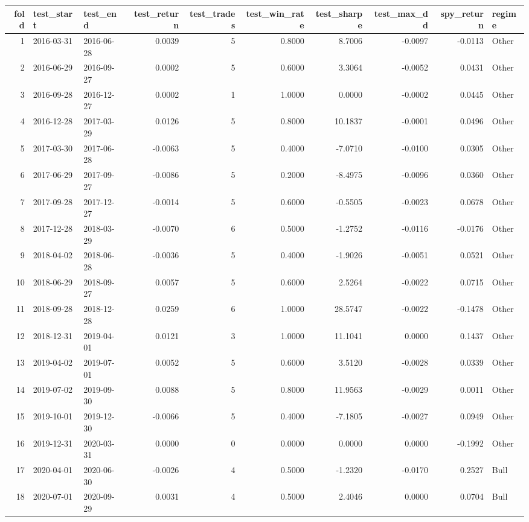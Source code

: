 \begin{tabular}{rllrrrrrrl}
\toprule
fold & test_start & test_end & test_return & test_trades & test_win_rate & test_sharpe & test_max_dd & spy_return & regime \\
\midrule
1 & 2016-03-31 & 2016-06-28 & 0.0039 & 5 & 0.8000 & 8.7006 & -0.0097 & -0.0113 & Other \\
2 & 2016-06-29 & 2016-09-27 & 0.0002 & 5 & 0.6000 & 3.3064 & -0.0052 & 0.0431 & Other \\
3 & 2016-09-28 & 2016-12-27 & 0.0002 & 1 & 1.0000 & 0.0000 & -0.0002 & 0.0445 & Other \\
4 & 2016-12-28 & 2017-03-29 & 0.0126 & 5 & 0.8000 & 10.1837 & -0.0001 & 0.0496 & Other \\
5 & 2017-03-30 & 2017-06-28 & -0.0063 & 5 & 0.4000 & -7.0710 & -0.0100 & 0.0305 & Other \\
6 & 2017-06-29 & 2017-09-27 & -0.0086 & 5 & 0.2000 & -8.4975 & -0.0096 & 0.0360 & Other \\
7 & 2017-09-28 & 2017-12-27 & -0.0014 & 5 & 0.6000 & -0.5505 & -0.0023 & 0.0678 & Other \\
8 & 2017-12-28 & 2018-03-29 & -0.0070 & 6 & 0.5000 & -1.2752 & -0.0116 & -0.0176 & Other \\
9 & 2018-04-02 & 2018-06-28 & -0.0036 & 5 & 0.4000 & -1.9026 & -0.0051 & 0.0521 & Other \\
10 & 2018-06-29 & 2018-09-27 & 0.0057 & 5 & 0.6000 & 2.5264 & -0.0022 & 0.0715 & Other \\
11 & 2018-09-28 & 2018-12-28 & 0.0259 & 6 & 1.0000 & 28.5747 & -0.0022 & -0.1478 & Other \\
12 & 2018-12-31 & 2019-04-01 & 0.0121 & 3 & 1.0000 & 11.1041 & 0.0000 & 0.1437 & Other \\
13 & 2019-04-02 & 2019-07-01 & 0.0052 & 5 & 0.6000 & 3.5120 & -0.0028 & 0.0339 & Other \\
14 & 2019-07-02 & 2019-09-30 & 0.0088 & 5 & 0.8000 & 11.9563 & -0.0029 & 0.0011 & Other \\
15 & 2019-10-01 & 2019-12-30 & -0.0066 & 5 & 0.4000 & -7.1805 & -0.0027 & 0.0949 & Other \\
16 & 2019-12-31 & 2020-03-31 & 0.0000 & 0 & 0.0000 & 0.0000 & 0.0000 & -0.1992 & Other \\
17 & 2020-04-01 & 2020-06-30 & -0.0026 & 4 & 0.5000 & -1.2320 & -0.0170 & 0.2527 & Bull \\
18 & 2020-07-01 & 2020-09-29 & 0.0031 & 4 & 0.5000 & 2.4046 & 0.0000 & 0.0704 & Bull \\

\end{tabular}
